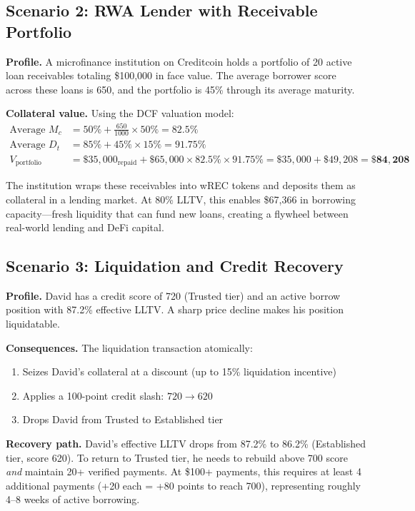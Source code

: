 \documentclass[11pt,a4paper]{article}
\begin{document}
\subsection{Scenario 2: RWA Lender with Receivable Portfolio}

\textbf{Profile.} A microfinance institution on Creditcoin holds a portfolio of 20 active loan receivables totaling \$100{,}000 in face value. The average borrower score across these loans is 650, and the portfolio is 45\% through its average maturity.

\textbf{Collateral value.} Using the DCF valuation model:
\begin{align*}
\text{Average } M_c &= 50\% + \frac{650}{1000} \times 50\% = 82.5\% \\
\text{Average } D_t &= 85\% + 45\% \times 15\% = 91.75\% \\
V_{\text{portfolio}} &= \$35{,}000_{\text{repaid}} + \$65{,}000 \times 82.5\% \times 91.75\% = \$35{,}000 + \$49{,}208 = \mathbf{\$84{,}208}
\end{align*}

The institution wraps these receivables into wREC tokens and deposits them as collateral in a lending market. At 80\% LLTV, this enables \$67{,}366 in borrowing capacity---fresh liquidity that can fund new loans, creating a flywheel between real-world lending and DeFi capital.

\subsection{Scenario 3: Liquidation and Credit Recovery}

\textbf{Profile.} David has a credit score of 720 (Trusted tier) and an active borrow position with 87.2\% effective LLTV. A sharp price decline makes his position liquidatable.

\textbf{Consequences.} The liquidation transaction atomically:
\begin{enumerate}
\item Seizes David's collateral at a discount (up to 15\% liquidation incentive)
\item Applies a 100-point credit slash: $720 \rightarrow 620$
\item Drops David from Trusted to Established tier
\end{enumerate}

\textbf{Recovery path.} David's effective LLTV drops from 87.2\% to 86.2\% (Established tier, score 620). To return to Trusted tier, he needs to rebuild above 700 score \emph{and} maintain 20+ verified payments. At \$100+ payments, this requires at least 4 additional payments (+20 each = +80 points to reach 700), representing roughly 4--8 weeks of active borrowing.
\end{document}
